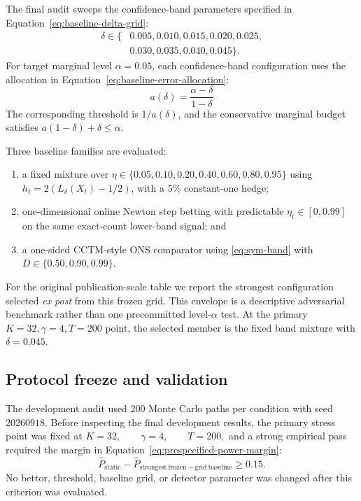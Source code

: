 The final audit sweeps the confidence-band parameters specified in Equation~\eqref{eq:baseline-delta-grid}:
\begin{equation}
\begin{aligned}
\delta\in\{&
0.005,0.010,0.015,0.020,0.025,\\
&0.030,0.035,0.040,0.045\}.
\end{aligned}
  \label{eq:baseline-delta-grid}
\end{equation}
For target marginal level \(\alpha=0.05\), each confidence-band configuration uses the allocation in Equation~\eqref{eq:baseline-error-allocation}:
\begin{equation}
a(\delta)
  =
  \frac{\alpha-\delta}{1-\delta}
  \label{eq:baseline-error-allocation}
\end{equation}
The corresponding threshold is \(1/a(\delta)\), and the conservative marginal budget satisfies \(a(1-\delta)+\delta\le\alpha\).

Three baseline families are evaluated:
\begin{enumerate}[leftmargin=*]
  \item a fixed mixture over \(\eta\in\{0.05,0.10,0.20,0.40,0.60,0.80,0.95\}\) using \(h_t=2(L_\delta(X_t)-1/2)\), with a \(5\%\) constant-one hedge;
  \item one-dimensional online Newton step betting with predictable \(\eta_t\in[0,0.99]\) on the same exact-count lower-band signal; and
  \item a one-sided CCTM-style ONS comparator using \eqref{eq:sym-band} with \(D\in\{0.50,0.90,0.99\}\).
\end{enumerate}

For the original publication-scale table we report the strongest configuration selected \emph{ex post} from this frozen grid. This envelope is a descriptive adversarial benchmark rather than one precommitted level-\(\alpha\) test. At the primary \(K=32,\gamma=4,T=200\) point, the selected member is the fixed band mixture with \(\delta=0.045\).

\subsection{Protocol freeze and validation}

The development audit used 200 Monte Carlo paths per condition with seed \(20260918\). Before inspecting the final development results, the primary stress point was fixed at
\(K=32,\qquad \gamma=4,\qquad T=200,\)
and a strong empirical pass required the margin in Equation~\eqref{eq:prespecified-power-margin}:
\begin{equation}
\widehat P_{\mathrm{static}}
  -
  \widehat P_{\mathrm{strongest\ frozen-grid\ baseline}}
  \ge0.15.
  \label{eq:prespecified-power-margin}
\end{equation}
No bettor, threshold, baseline grid, or detector parameter was changed after this criterion was evaluated.

